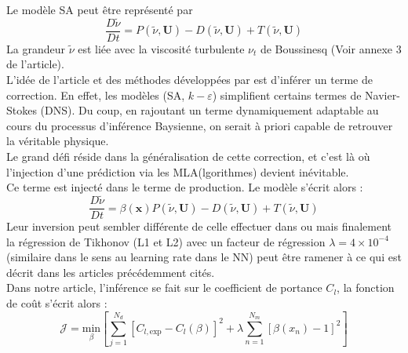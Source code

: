 \documentclass[a4paper,12pt]{report}
\newcommand{\bepar}[1]{
	\left( #1 \right)  
}
\newcommand{\becro}[1]{
	\left[ #1 \right]  
}
\numberwithin{equation}{section} %
\begin{document}
\noindent Le modèle SA peut être représenté par 
\begin{equation}
\frac{D \tilde{\nu}}{Dt} = P\bepar{\tilde{\nu}, \textbf{U}} - D\bepar{\tilde{\nu}, \textbf{U}} + T\bepar{\tilde{\nu}, \textbf{U}}
\end{equation}
La grandeur $\tilde{\nu}$  est liée avec la viscosité turbulente $\nu_t$ de Boussinesq (Voir annexe 3 de l'article).\\
L'idée de l'article et des méthodes développées par \cite{parish2016paradigm} est d'inférer un terme de correction. En effet, les modèles (SA, $k-\varepsilon$) simplifient certains termes de Navier-Stokes (DNS). Du coup, en rajoutant un terme dynamiquement adaptable au cours du processus d'inférence Baysienne, on serait à priori capable de retrouver la véritable physique.\\
Le grand défi réside dans la généralisation de cette correction, et c'est là où l'injection d'une prédiction via les MLA(lgorithmes) devient inévitable.\\
Ce terme est injecté dans le terme de production. Le modèle s'écrit alors :
\begin{equation}
\frac{D \tilde{\nu}}{Dt} = \beta\bepar{\textbf{x}}P\bepar{\tilde{\nu}, \textbf{U}} - D\bepar{\tilde{\nu}, \textbf{U}} + T\bepar{\tilde{\nu}, \textbf{U}}
\end{equation}
Leur inversion peut sembler différente de celle effectuer dans \cite{parish2016paradigm} ou \cite{tarantola2005inverse} mais finalement la régression de Tikhonov (L1 et L2) avec un facteur de régression $\lambda = 4 \times 10^{-4}$ (similaire dans le sens au learning rate dans le NN) peut être ramener à ce qui est décrit dans les articles précédemment cités. \\
Dans notre article, l'inférence se fait sur le coefficient de portance $C_l$, la fonction de coût s'écrit alors :
\begin{equation*}
\mathcal{J} = \underset{\beta}{\text{min}}\becro{\sum^{N_d}_{j=1}\becro{C_{l,\text{exp}} - C_l\bepar{\beta}}^2  + \lambda \sum^{N_m}_{n=1} \becro{\beta\bepar{x_n}-1}^2}
\end{equation*}
\end{document}
